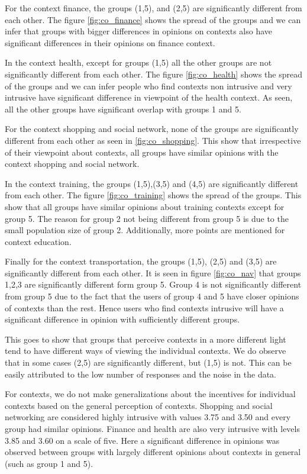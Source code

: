 For the context finance, the groups (1,5), and (2,5) are significantly different from each other. The figure \ref{fig:co_finance} shows the spread of the groups and we can infer that groups with bigger differences in opinions on contexts also have significant differences in their opinions on finance context.

In the context health, except for groups (1,5) all the other groups are not significantly different from each other. The figure \ref{fig:co_health} shows the spread of the groups and we can infer people who find contexts non intrusive and very intrusive have significant difference in viewpoint of the health context. As seen, all the other groups have significant overlap with groups 1 and 5.

For the context shopping and social network, none of the groups are significantly different from each other as seen in \ref{fig:co_shopping}. This show that irrespective of their viewpoint about contexts, all groups have similar opinions with the context shopping and social network.

In the context training, the groups (1,5),(3,5) and (4,5) are significantly different from each other. The figure \ref{fig:co_training} shows the spread of the groups. This show that all groups have similar opinions about training contexts except for group 5. The reason for group 2 not being different from group 5 is due to the small population size of group 2. Additionally, more points are mentioned for context education.

Finally for the context transportation, the groups (1,5), (2,5) and (3,5) are significantly different from each other. It is seen in figure \ref{fig:co_nav} that groups 1,2,3 are significantly different form group 5. Group 4 is not significantly different from group 5 due to the fact that the users of group 4 and 5 have closer opinions of contexts than the rest. Hence users who find contexts intrusive will have a significant difference in opinion with sufficiently different groups.

This goes to show that groups that perceive contexts in a more different light tend to have different ways of viewing the individual contexts. We do observe that in some cases (2,5) are significantly different, but (1,5) is not. This can be easily attributed to the low number of responses
and the noise in the data. 

For contexts, we do not make generalizations about the incentives for individual contexts based on the general perception of contexts. Shopping and social networking are considered highly intrusive with values 3.75 and 3.50 and every group had similar opinions. Finance and health are also very intrusive with levels 3.85 and 3.60 on a scale of five. Here a significant difference in opinions was observed between groups with largely different opinions about contexts in general (such as group 1 and 5).

